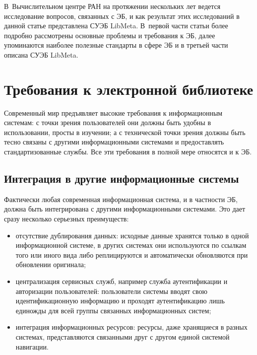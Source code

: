 \begin{multicols}{2}
  В~Вычислительном центре РАН на протяжении нескольких лет ведется исследование 
вопросов, связанных с ЭБ, и как результат этих исследований в данной статье представлена 
СУЭБ LibMeta. В~первой части статьи более подробно рассмотрены основные проблемы и 
требования к ЭБ, далее упоминаются наиболее полезные стандарты в сфере ЭБ и в третьей 
части описана СУЭБ LibMeta.

\vspace*{-12pt}
  
\section{Требования к электронной библиотеке}
  
  Современный мир предъявляет высокие требования к информационным системам: с точки 
зрения пользователей они должны быть удобны в использовании, просты в изучении; а с 
технической точки зрения должны быть тесно связаны с другими информационными 
системами и предоставлять стандартизованные службы. Все эти требования в полной мере 
относятся и к ЭБ.
  
  \subsection{Интеграция в другие информационные системы}
  
  Фактически любая современная инфор\-ма\-ци\-онная система, и в частности ЭБ, должна быть\linebreak 
интегрирована с другими информационными сис\-те\-ма\-ми. Это дает сразу несколько серьезных 
преимуществ:
  \begin{itemize}
\item отсутствие дублирования данных: исходные данные хранятся только в одной 
информационной системе, в других системах они используются по ссылкам того или иного 
вида либо реплицируются и автоматически обновляются при обновлении оригинала;\\[-14pt]
\item централизация сервисных служб, например служба аутентификации и 
авторизации пользователей: пользователи системы вводят свою идентификационную 
информацию и проходят аутентификацию лишь единожды для всей группы связанных 
информационных сис\-тем;\\[-14pt]
\item интеграция информационных ресурсов: ресурсы, даже хранящиеся в разных системах, 
представляются связанными друг с другом единой системой навигации.
\end{itemize}


\end{multicols}
